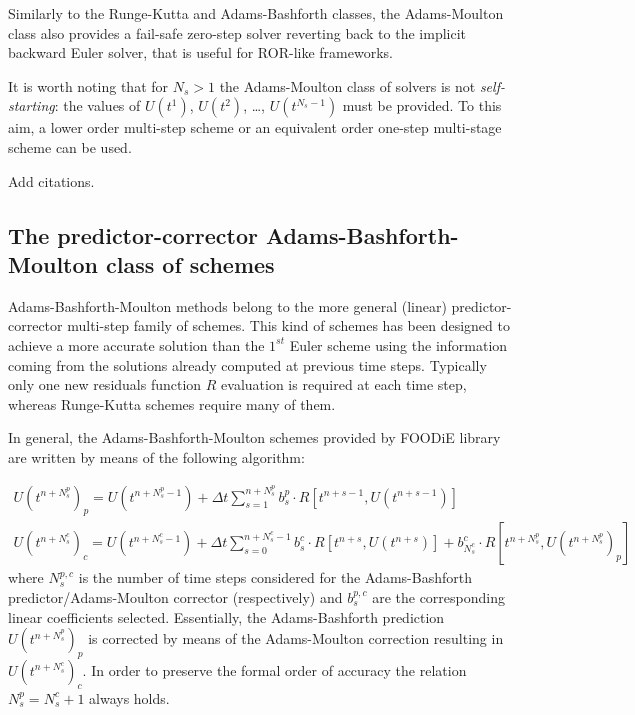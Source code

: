 \documentclass[pdftex,preprint,3p,times,numbers]{elsarticle}
\begin{document}
Similarly to the Runge-Kutta and Adams-Bashforth classes, the Adams-Moulton class also provides a fail-safe zero-step solver reverting back to the implicit backward Euler solver, that is useful for ROR-like frameworks.

It is worth noting that for $N_s>1$ the Adams-Moulton class of solvers is not \emph{self-starting}: the values of $U\left(t^{1}\right)$, $U\left(t^{2}\right)$, \dots, $U\left(t^{N_s-1}\right)$ must be provided. To this aim, a lower order multi-step scheme or an equivalent order one-step multi-stage scheme can be used.

{\color{red} Add citations.}

\subsection{The predictor-corrector Adams-Bashforth-Moulton class of schemes}

Adams-Bashforth-Moulton methods belong to the more general (linear) predictor-corrector multi-step family of schemes. This kind of schemes has been designed to achieve a more accurate solution than the $1^{st}$ Euler scheme using the information coming from the solutions already computed at previous time steps. Typically only one new residuals function $R$ evaluation is required at each time step, whereas Runge-Kutta schemes require many of them.

In general, the Adams-Bashforth-Moulton schemes provided by FOODiE library are written by means of the following algorithm:

\begin{equation}
  \begin{matrix}
    U\left(t^{n+N_s^p}\right)_p = U\left(t^{n+N_s^p-1}\right) +\Delta t \sum_{s=1}^{n+N_s^p}{ b_s^p \cdot R\left[t^{n+s-1}, U\left(t^{n+s-1}\right)\right]}   \\
    U\left(t^{n+N_s^c}\right)_c = U\left(t^{n+N_s^c-1}\right) +\Delta t \sum_{s=0}^{n+N_s^c-1}{ b_s^c \cdot R\left[t^{n+s}, U\left(t^{n+s}\right)\right]} + b_{N_s^c}^c\cdot R\left[t^{n+N_s^p}, U\left(t^{n+N_s^p}\right)_p\right]
  \end{matrix}
\label{eq:ABM}
\end{equation}
where $N_s^{p,c}$ is the number of time steps considered for the Adams-Bashforth predictor/Adams-Moulton corrector (respectively) and $b_s^{p,c}$ are the corresponding linear coefficients selected. Essentially, the Adams-Bashforth prediction $U\left(t^{n+N_s^p}\right)_p$ is corrected by means of the Adams-Moulton correction resulting in $U\left(t^{n+N_s^c}\right)_c$. In order to preserve the formal order of accuracy the relation $N_s^p=N_s^c+1$ always holds.
\end{document}

